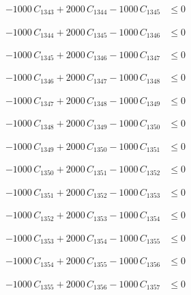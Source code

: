 \documentclass[a4paper,11pt]{article}
\begin{document}
\begin{align}
-1000\,C_{1343} + 2000\,C_{1344} - 1000\,C_{1345} &\leq 0 \nonumber
\end{align}

\begin{align}
-1000\,C_{1344} + 2000\,C_{1345} - 1000\,C_{1346} &\leq 0 \nonumber
\end{align}

\begin{align}
-1000\,C_{1345} + 2000\,C_{1346} - 1000\,C_{1347} &\leq 0 \nonumber
\end{align}

\begin{align}
-1000\,C_{1346} + 2000\,C_{1347} - 1000\,C_{1348} &\leq 0 \nonumber
\end{align}

\begin{align}
-1000\,C_{1347} + 2000\,C_{1348} - 1000\,C_{1349} &\leq 0 \nonumber
\end{align}

\begin{align}
-1000\,C_{1348} + 2000\,C_{1349} - 1000\,C_{1350} &\leq 0 \nonumber
\end{align}

\begin{align}
-1000\,C_{1349} + 2000\,C_{1350} - 1000\,C_{1351} &\leq 0 \nonumber
\end{align}

\begin{align}
-1000\,C_{1350} + 2000\,C_{1351} - 1000\,C_{1352} &\leq 0 \nonumber
\end{align}

\begin{align}
-1000\,C_{1351} + 2000\,C_{1352} - 1000\,C_{1353} &\leq 0 \nonumber
\end{align}

\begin{align}
-1000\,C_{1352} + 2000\,C_{1353} - 1000\,C_{1354} &\leq 0 \nonumber
\end{align}

\begin{align}
-1000\,C_{1353} + 2000\,C_{1354} - 1000\,C_{1355} &\leq 0 \nonumber
\end{align}

\begin{align}
-1000\,C_{1354} + 2000\,C_{1355} - 1000\,C_{1356} &\leq 0 \nonumber
\end{align}

\begin{align}
-1000\,C_{1355} + 2000\,C_{1356} - 1000\,C_{1357} &\leq 0 \nonumber
\end{align}
\end{document}
